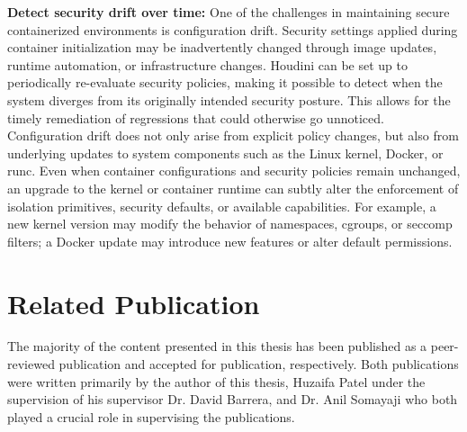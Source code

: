 \documentclass[12pt]{report}
\begin{document}
\begin{doublespace}
\noindent\textbf{Detect security drift over time:} One of the challenges in maintaining secure containerized environments is configuration drift. Security settings applied during container initialization may be inadvertently changed through image updates, runtime automation, or infrastructure changes. Houdini can be set up to periodically re-evaluate security policies, making it possible to detect when the system diverges from its originally intended security posture. This allows for the timely remediation of regressions that could otherwise go unnoticed. Configuration drift does not only arise from explicit policy changes, but also from underlying updates to system components such as the Linux kernel, Docker, or runc. Even when container configurations and security policies remain unchanged, an upgrade to the kernel or container runtime can subtly alter the enforcement of isolation primitives, security defaults, or available capabilities. For example, a new kernel version may modify the behavior of namespaces, cgroups, or seccomp filters; a Docker update may introduce new features or alter default permissions.

\section{Related Publication}

The majority of the content presented in this thesis has been published as a peer-reviewed publication and accepted for publication, respectively. Both publications were written primarily by the author of this thesis, Huzaifa Patel under the supervision of his supervisor Dr. David Barrera, and Dr. Anil Somayaji who both played a crucial role in supervising the publications.

\end{doublespace} 	\fontsize{12pt}{14pt} \selectfont
\end{document}
